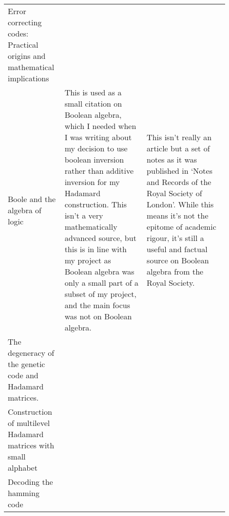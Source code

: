 \documentclass{article}
\begin{document}
\begin{center}
{\begin{longtable}{p{0.2\linewidth} p{0.35\linewidth} p{0.35\linewidth}}
    Error correcting codes: Practical origins and mathematical implications \citep*{CodesOrigins1978Pless} &

    \\

    Boole and the algebra of logic \citep*{BooleRecords1956Kneale} &

    This is used as a small citation on Boolean algebra, which I needed when I
    was writing about my decision to use boolean inversion rather than additive
    inversion for my Hadamard construction. This isn't a very mathematically
    advanced source, but this is in line with my project as Boolean algebra was
    only a small part of a subset of my project, and the main focus was not on
    Boolean algebra. &

    This isn't really an article but a set of notes as it was published in
    `Notes and Records of the Royal Society of London'. While this means it's
    not the epitome of academic rigour, it's still a useful and factual source
    on Boolean algebra from the Royal Society.

    \\

    The degeneracy of the genetic code and Hadamard matrices. \citep*{DegeneracyHadamard2008Petoukhov}

    \\

    Construction of multilevel Hadamard matrices with small alphabet \citep*{MultilevelConstruction2008TrinhFan}

    \\

    Decoding the hamming code \citep*{DecodingHamming2006Eherenborg}

    \\

    \bottomrule
    \end{longtable}
    }
    \end{center}

    
    
\end{document}
